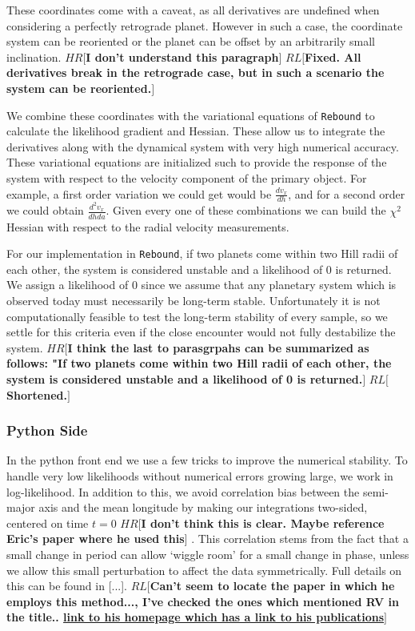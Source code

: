 \documentclass{aa}
\def\memohr#1{\color{blue}$HR[${\bf #1}$]$ \color{black}}
\def\memorl#1{\color{gray}$RL[${\bf #1}$]$ \color{black}}
\begin{document}
These coordinates come with a caveat, as all derivatives are undefined when considering a perfectly retrograde planet. However in such a case, the coordinate system can be reoriented or the planet can be offset by an arbitrarily small inclination.
\memohr{I don't understand this paragraph}
\memorl{Fixed. All derivatives break in the retrograde case, but in such a scenario the system can be reoriented.}

We combine these coordinates with the variational equations of \texttt{Rebound} to calculate the likelihood gradient and Hessian. 
These allow us to integrate the derivatives along with the dynamical system with very high numerical accuracy. 
These variational equations are initialized such to provide the response of the system with respect to the velocity component of the primary object. 
For example, a first order variation we could get would be $\frac{dv_x}{dh}$, and for a second order we could obtain $\frac{d^2v_x}{dhda}$. 
Given every one of these combinations we can build the $\chi^2$ Hessian with respect to the radial velocity measurements.

For our implementation in \texttt{Rebound}, if two planets come within two Hill radii of each other, the system is considered unstable and a likelihood of 0 is returned. 
We assign a likelihood of 0 since we assume that any planetary system which is observed today must necessarily be long-term stable. 
Unfortunately it is not computationally feasible to test the long-term stability of every sample, so we settle for this criteria even if the close encounter would not fully destabilize the system.
\memohr{I think the last to parasgrpahs can be summarized as follows: "If two planets come within two Hill radii of each other, the system is considered unstable and a likelihood of 0 is returned.}
\memorl{Shortened.}

\subsubsection{Python Side}
In the python front end we use a few tricks to improve the numerical stability. 
To handle very low likelihoods without numerical errors growing large, we work in log-likelihood. 
In addition to this, we avoid correlation bias between the semi-major axis and the mean longitude by making our integrations two-sided, centered on time $t=0$ \memohr{I don't think this is clear. Maybe reference Eric's paper where he used this}.
This correlation stems from the fact that a small change in period can allow `wiggle room' for a small change in phase, unless we allow this small perturbation to affect the data symmetrically.
Full details on this can be found in [...].
\memorl{Can't seem to locate the paper in which he employs this method..., I've checked the ones which mentioned RV in the title.. \href{http://astro.psu.edu/people/ebf11}{link to his homepage which has a link to his publications}}
\end{document}

